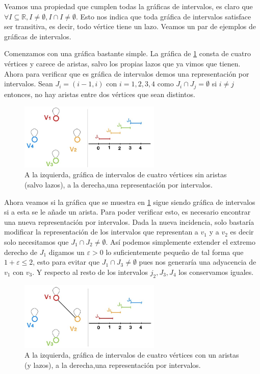 Veamos una propiedad que cumplen todas la gráficas de intervalos, es claro que $\forall I\subseteq \mathbb{R}, I\neq \emptyset, I\cap I \neq \emptyset$. Esto nos indica que toda gráfica de intervalos satisface ser transitiva, es decir, todo vértice tiene un lazo.
Veamos un par de ejemplos de gráficas de intervalos.


Comenzamos con una gráfica bastante simple. La gráfica de \cref{fig:GrafInt01}
consta de cuatro vértices y carece de aristas, salvo los propias lazos que ya
vimos que tienen. Ahora para verificar que es gráfica de intervalos demos una
representación por intervalos. Sean $J_i = (i-1, i)$ con $i=1,2,3,4$ como $J_i
\cap J_j = \emptyset$ si $i\neq j$ entonces,  no hay aristas entre dos vértices
que sean distintos.    

\begin{figure}[H]
  \centering
  \includegraphics[width=0.6\textwidth]{recursos/capturas/201}
  \caption{A la izquierda, gráfica de intervalos de cuatro vértices sin aristas (salvo lazos), a la derecha,una representación por intervalos.}
  \label{fig:GrafInt01}
\end{figure}



    \label{exmpl:202}
    Ahora veamos si la gráfica que se muestra en \cref{fig:GrafInt01} sigue siendo gráfica de intervalos si a esta se le añade un arista. Para poder verificar esto, es necesario encontrar una nueva representación por intervalos.
    Dada la nueva incidencia, solo bastaría modificar la representación de los intervalos que representan a $v_1 $ y a $v_2$ es decir solo necesitamos que $J_1 \cap J_2 \neq \emptyset$.
    Así podemos simplemente extender el extremo derecho de $J_1$ digamos un $\varepsilon >0 $ lo suficientemente pequeño de tal forma que $1+\varepsilon \leq 2$, esto para evitar que $J_1 \cap J_3 \neq \emptyset$ pues nos generaría una adyacencia de $v_1 $ con $v_3$. Y respecto al resto de los intervalos $j_2, J_3, J_4$ los conservamos iguales.    


\begin{figure}[H]
  \centering
  \includegraphics[width=0.6\textwidth]{recursos/capturas/202}
  \caption{A la izquierda, gráfica de intervalos de cuatro vértices con un aristas (y lazos), a la derecha,una representación por intervalos.}
  \label{fig:GrafInt02}
\end{figure}


